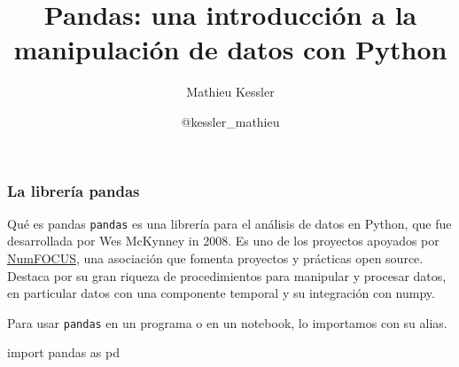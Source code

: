 \documentclass[9pt]{beamer}
\begin{document}
\title{Pandas: una introducción a la manipulación de datos con Python}

\author[Mathieu Kessler]{Mathieu Kessler}
\date{@kessler\_mathieu}{}%

\begin{frame}
  \titlepage
\end{frame}

\begin{frame}[fragile]
  \frametitle{La librería pandas}
  \begin{block}{Qué es pandas}
    {\tt pandas} es una librería para el análisis de datos en Python, que fue desarrollada por Wes McKynney in 2008. Es uno de los proyectos apoyados por \href{https://numfocus.org}{NumFOCUS}, una asociación que fomenta proyectos y prácticas open source.\\
    Destaca por su gran riqueza de procedimientos para manipular y procesar datos, en particular datos con una componente temporal y su integración con numpy.
  \end{block}

  Para usar {\tt pandas} en un programa o en un notebook, lo importamos con su alias.
  \begin{pyblock}
import pandas as pd
  \end{pyblock}
\end{frame}
\end{document}
